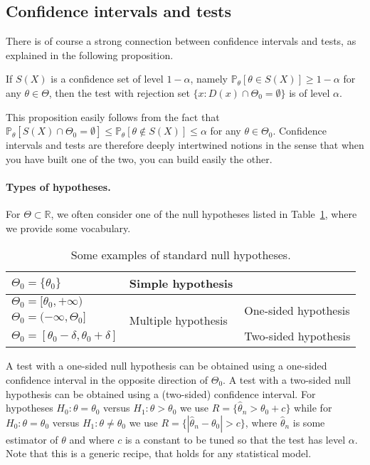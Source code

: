 \documentclass[
	fontsize=11pt, %
	twoside=false, %
	numbers=noenddot, %
]{kaobook}
\renewcommand{\P}{\mathbb P}
\newcommand{\R}{\mathbb R}
\newcommand{\wh}{\widehat}
\begin{document}
\subsection{Confidence intervals and tests} %


There is of course a strong connection between confidence intervals and tests, as explained in the following proposition.
\begin{proposition}
	If $S(X)$ is a confidence set of level $1 - \alpha$, namely $\P_\theta[ \theta \in S(X)] \geq 1 - \alpha$ for any $\theta \in \Theta$, then the test with rejection set $\{ x : D(x) \cap \Theta_0  = \emptyset\}$ is of level $\alpha$.
\end{proposition}
This proposition easily follows from the fact that $\P_\theta[ S(X) \cap \Theta_0 = \emptyset] \leq \P_\theta[ \theta \notin S(X) ] \leq \alpha$ for any $\theta \in \Theta_0$.
Confidence intervals and tests are therefore deeply intertwined notions in the sense that when you have built one of the two, you can build easily the other.

\paragraph{Types of hypotheses.} %

For $\Theta \subset \R$, we often consider one of the null hypotheses listed in Table~\ref{tab:standard-null-hypothesis}, where we provide some vocabulary.
\begin{table}[htbp]
	\centering
	\small
	\begin{tabular}{|l|l|l|}\hline
		$\Theta_0 = \{ \theta_0 \}$ & Simple hypothesis & \\ \hline
		$\Theta_0 = [\theta_0, +\infty)$ & \multirow{3}{*}{Multiple hypothesis} & \multirow{2}{*}{One-sided hypothesis} \\
		$\Theta_0 = (-\infty, \Theta_0]$ & & \\  \cline{3-3}
		$\Theta_0 = [\theta_0 - \delta, \theta_0 + \delta]$ & & Two-sided hypothesis \\ \hline
	\end{tabular}
	\caption{Some examples of standard null hypotheses.}
	\label{tab:standard-null-hypothesis}
\end{table}

A test with a one-sided null hypothesis can be obtained using a one-sided confidence interval in the opposite direction of $\Theta_0$. A test with a two-sided null hypothesis can be obtained using a (two-sided) confidence interval.
For hypotheses $H_0 : \theta = \theta_0$ versus $H_1 : \theta > \theta_0$ we use $R = \{ \wh \theta_n > \theta_0 + c \}$ while for $H_0 : \theta = \theta_0$ versus $H_1 : \theta \neq \theta_0$ we use $R = \{ | \wh \theta_n - \theta_0 | > c \}$, where $\wh \theta_n$ is some estimator of $\theta$ and where $c$ is a constant to be tuned so that the test has level $\alpha$.
Note that this is a generic recipe, that holds for any statistical model.
\end{document}
